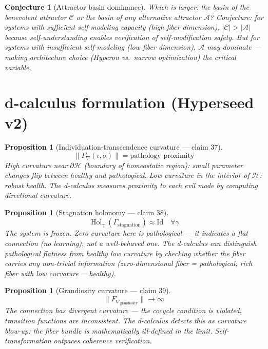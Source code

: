 \documentclass[11pt,a4paper]{article}
\newtheorem{proposition}[definition]{Proposition}
\newtheorem{conjecture}[definition]{Conjecture}
\begin{document}
\begin{conjecture}[Attractor basin dominance]
Which is larger: the basin of the benevolent attractor $\mathcal{C}$
or the basin of any alternative attractor $\mathcal{A}$? Conjecture:
for systems with sufficient self-modeling capacity (high fiber dimension),
$|\mathcal{C}| > |\mathcal{A}|$ because self-understanding enables
verification of self-modification safety. But for systems with
insufficient self-modeling (low fiber dimension), $\mathcal{A}$ may
dominate --- making architecture choice (Hyperon vs.\ narrow optimization)
the critical variable.
\end{conjecture}

\section{d-calculus formulation (Hyperseed v2)}

\begin{proposition}[Individuation-transcendence curvature --- claim 37]
\label{prop:it_curv}
\[
  \|F_\nabla(\iota, \sigma)\| = \text{pathology proximity}
\]
High curvature near $\partial \mathcal{H}$ (boundary of homeostatic
region): small parameter changes flip between healthy and pathological.
Low curvature in the interior of $\mathcal{H}$: robust health. The
d-calculus measures proximity to each evil mode by computing directional
curvature.
\end{proposition}

\begin{proposition}[Stagnation holonomy --- claim 38]
\label{prop:stag_hol}
\[
  \operatorname{Hol}_\gamma(\Gamma_{\text{stagnation}}) \approx
    \text{Id} \quad \forall \gamma
\]
The system is frozen. Zero curvature here is \emph{pathological} ---
it indicates a flat connection (no learning), not a well-behaved one.
The d-calculus can distinguish pathological flatness from healthy
low curvature by checking whether the fiber carries any non-trivial
information (zero-dimensional fiber = pathological; rich fiber with
low curvature = healthy).
\end{proposition}

\begin{proposition}[Grandiosity curvature --- claim 39]
\label{prop:gran_curv}
\[
  \|F_{\nabla_{\text{grandiosity}}}\| \to \infty
\]
The connection has divergent curvature --- the cocycle condition is
violated, transition functions are inconsistent. The d-calculus
detects this as curvature blow-up: the fiber bundle is mathematically
ill-defined in the limit. Self-transformation outpaces coherence
verification.
\end{proposition}
\end{document}
